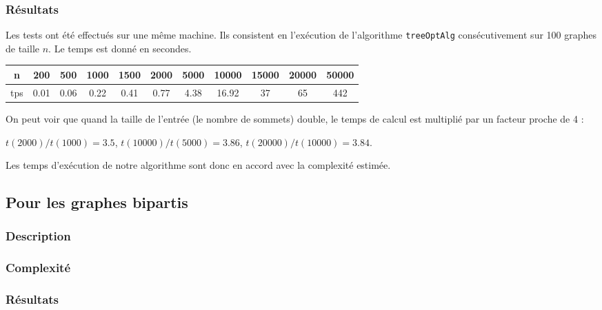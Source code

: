 \documentclass[a4paper,10pt]{article}
\begin{document}
\subsubsection{Résultats}

Les tests ont été effectués sur une même machine. Ils consistent en l'exécution de l'algorithme \texttt{treeOptAlg} consécutivement sur 100 graphes de taille $n$. Le temps est donné en secondes.

\begin{center}
\begin{tabular}{|c|c|c|c|c|c|c|c|c|c|c|}
	\hline 
	n & 200 & 500 & 1000 & 1500 & 2000 & 5000 & 10000 & 15000 & 20000 & 50000 \\
	\hline
	tps & 0.01 & 0.06 & 0.22 & 0.41 & 0.77 & 4.38 & 16.92 & 37 & 65 & 442 \\
	\hline
\end{tabular}
\end{center}

On peut voir que quand la taille de l'entrée (le nombre de sommets) double, le temps de calcul est multiplié par un facteur proche de 4 :

$t(2000)/t(1000) = 3.5$, $t(10000)/t(5000) = 3.86$, $t(20000)/t(10000) = 3.84$.

Les temps d'exécution de notre algorithme sont donc en accord avec la complexité estimée.

\subsection{Pour les graphes bipartis}

\subsubsection{Description}


\subsubsection{Complexité}


\subsubsection{Résultats}
\end{document}
